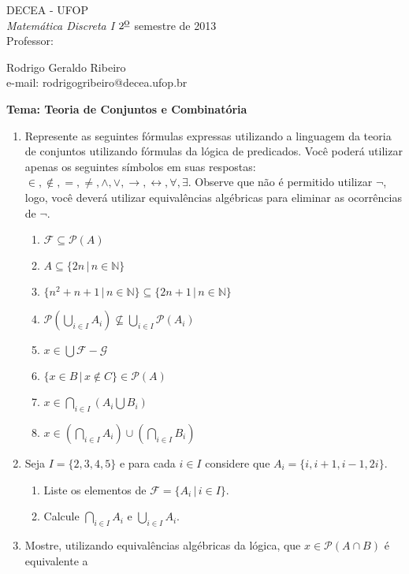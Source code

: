 \documentclass[11pt,a4paper]{report}
\begin{document}
 
 \hfill DECEA - UFOP \\
{\it Matem\'atica Discreta I}
 \hfill $\mbox{2}^{\mbox{\underline{o}}}$ semestre de 2013 \\
Professor: \parbox[t]{14cm}{Rodrigo Geraldo Ribeiro \\
                     e-mail: rodrigogribeiro@decea.ufop.br}
 
 \hfill {\bf Tema: Teoria de Conjuntos e Combinat\'oria}
 
\vspace*{3mm}
\begin{enumerate}
	\item Represente as seguintes f\'ormulas expressas utilizando a linguagem da teoria de conjuntos
	      utilizando f\'ormulas da l\'ogica de predicados. Voc\^e poder\'a utilizar apenas 
	      os seguintes s\'imbolos em suas respostas: $\in,\not\in,=,\neq,\land,\lor,\rightarrow,\leftrightarrow,\forall,\exists$.
	      Observe que n\~ao \'e permitido utilizar $\neg$, logo, voc\^e dever\'a utilizar equival\^encias alg\'ebricas para eliminar
	      as ocorr\^encias de $\neg$.
	\begin{enumerate}
		\item $\mathcal{F}\subseteq\mathcal{P}(A)$
		\item $A\subseteq\{2n\, |\, n\in\mathbb{N}\}$
		\item $\{n^2 + n + 1\,|\, n\in\mathbb{N}\}\subseteq\{2n + 1\,|\,n\in\mathbb{N}\}$
		\item $\mathcal{P}(\bigcup_{i\in I}A_i)\not\subseteq \bigcup_{i\in I}\mathcal{P}(A_i)$
		\item $x\in\bigcup\mathcal{F} - \mathcal{G}$
		\item $\{x\in B\,|\,x\not\in C\}\in\mathcal{P}(A)$
		\item $x\in\bigcap_{i\in I}(A_i\bigcup B_i)$
		\item $x\in (\bigcap_{i\in I} A_i)\cup(\bigcap_{i \in I} B_i)$
	\end{enumerate}
	\item Seja $I=\{2,3,4,5\}$ e para cada $i\in I$ considere que $A_i=\{i , i+1, i -1, 2i\}$.
	\begin{enumerate}
		\item Liste os elementos de $\mathcal{F} = \{A_i\,|\,i\in I\}$.
		\item Calcule $\bigcap_{i \in I} A_i$ e $\bigcup_{i \in I} A_i$.
	\end{enumerate}
	\item Mostre, utilizando equival\^encias alg\'ebricas da l\'ogica, que $x\in\mathcal{P}(A\cap B)$ \'e equivalente a 

\end{enumerate}
\end{document}

